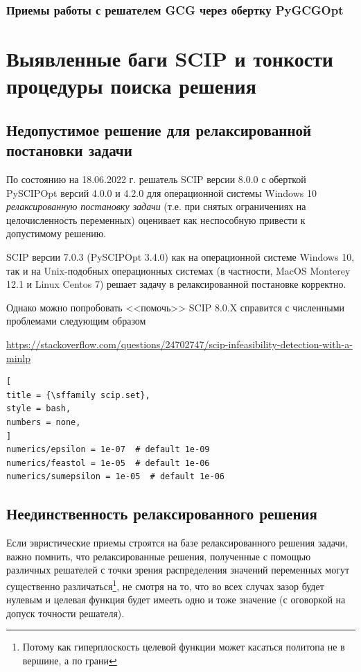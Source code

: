 \documentclass[%
	11pt,
	a4paper,
	utf8,
		]{article}
\begin{document}
\subsubsection{Приемы работы с решателем GCG через обертку PyGCGOpt}

\section{Выявленные баги SCIP и тонкости процедуры поиска решения}

\subsection{Недопустимое решение для релаксированной постановки задачи}

По состоянию на 18.06.2022 г. решатель SCIP версии 8.0.0 с оберткой PySCIPOpt версий 4.0.0 и 4.2.0 для операционной системы Windows 10 \emph{релаксированную постановку задачи} (т.е. при снятых ограничениях на целочисленность переменных) оценивает как неспособную привести к допустимому решению.

SCIP версии 7.0.3 (PySCIPOpt 3.4.0) как на операционной системе Windows 10, так и на Unix-подобных операционных системах (в частности, MacOS Monterey 12.1 и Linux Centos 7) решает задачу в релаксированной постановке корректно.

Однако можно попробовать <<помочь>> SCIP 8.0.X справится с численными проблемами следующим образом

\noindent\url{https://stackoverflow.com/questions/24702747/scip-infeasibility-detection-with-a-minlp}
\begin{lstlisting}[
title = {\sffamily scip.set},
style = bash,
numbers = none,
]
numerics/epsilon = 1e-07  # default 1e-09
numerics/feastol = 1e-05  # default 1e-06
numerics/sumepsilon = 1e-05  # default 1e-06
\end{lstlisting}

\subsection{Неединственность релаксированного решения}

Если эвристические приемы строятся на базе релаксированного решения задачи, важно помнить, что релаксированные решения, полученные с помощью различных решателей с точки зрения распределения значений переменных могут существенно различаться\footnote{Потому как гиперплоскость целевой функции может касаться политопа не в вершине, а по грани}, не смотря на то, что во всех случах зазор будет нулевым и целевая функция будет имееть одно и тоже значение (с оговоркой на допуск точности решателя). 
\end{document}
